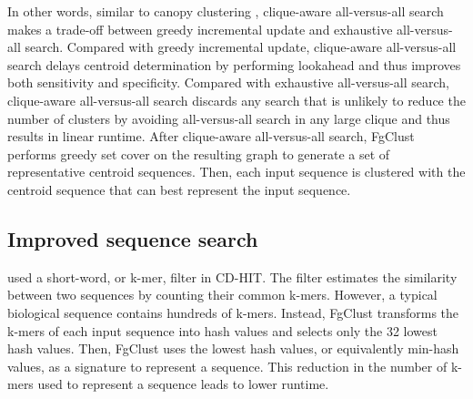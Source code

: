 \documentclass[11pt,letterpaper]{article}
\begin{document}
In other words, similar to canopy clustering \citep{mccallum2000efficient}, clique-aware all-versus-all search makes a trade-off between greedy incremental update and exhaustive all-versus-all search. 
Compared with greedy incremental update, clique-aware all-versus-all search delays centroid determination by performing lookahead and thus improves both sensitivity and specificity.
Compared with exhaustive all-versus-all search, clique-aware all-versus-all search discards any search that is unlikely to reduce the number of clusters by avoiding all-versus-all search in any large clique and thus results in linear runtime.
After clique-aware all-versus-all search, FgClust performs greedy set cover on the resulting graph to generate a set of representative centroid sequences.
Then, each input sequence is clustered with the centroid sequence that can best represent the input sequence.

\subsection{Improved sequence search}
\label{subsec:seqsearch}

 used a short-word, or k-mer, filter in CD-HIT.
The filter estimates the similarity between two sequences by counting their common k-mers.
However, a typical biological sequence contains hundreds of k-mers.
Instead, FgClust transforms the k-mers of each input sequence into hash values and selects only the 32 lowest hash values.
Then, FgClust uses the lowest hash values, or equivalently min-hash values, as a signature to represent a sequence.
This reduction in the number of k-mers used to represent a sequence leads to lower runtime.
\label{para:min-hash}
\end{document}
